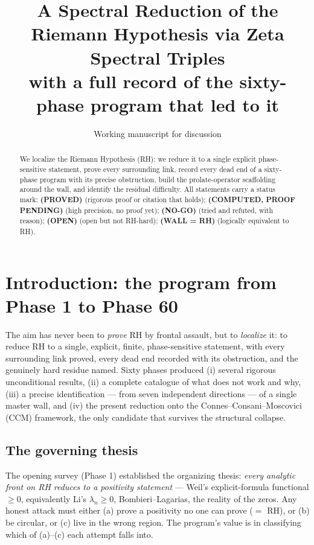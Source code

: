\documentclass[11pt]{article}
\title{A Spectral Reduction of the Riemann Hypothesis via Zeta Spectral Triples\\[2pt]
\large with a full record of the sixty-phase program that led to it}
\author{Working manuscript for discussion}
\date{}
\theoremstyle{remark}
\newcommand{\PROVED}{\textbf{(PROVED)}}
\newcommand{\COMP}{\textbf{(COMPUTED, PROOF PENDING)}}
\newcommand{\NOGO}{\textbf{(NO-GO)}}
\newcommand{\OPEN}{\textbf{(OPEN)}}
\newcommand{\WALL}{\textbf{(WALL = RH)}}
\begin{document}
\maketitle

\begin{abstract}
\noindent We localize the Riemann Hypothesis (RH): we reduce it to a single explicit
phase-sensitive statement, prove every surrounding link, record every dead end of a
sixty-phase program with its precise obstruction, build the prolate-operator scaffolding
around the wall, and identify the residual difficulty. All statements carry a status mark:
\PROVED{} (rigorous proof or citation that holds); \COMP{} (high precision, no proof yet);
\NOGO{} (tried and refuted, with reason); \OPEN{} (open but not RH-hard); \WALL{} (logically
equivalent to RH).
\end{abstract}

\section{Introduction: the program from Phase 1 to Phase 60}

The aim has never been to \emph{prove} RH by frontal assault, but to \emph{localize} it: to
reduce RH to a single, explicit, finite, phase-sensitive statement, with every surrounding link
proved, every dead end recorded with its obstruction, and the genuinely hard residue named.
Sixty phases produced (i) several rigorous unconditional results, (ii) a complete catalogue of
what does not work and why, (iii) a precise identification --- from seven independent
directions --- of a single master wall, and (iv) the present reduction onto the
Connes--Consani--Moscovici (CCM) framework, the only candidate that survives the structural
collapse.

\subsection{The governing thesis}
The opening survey (Phase 1) established the organizing thesis: \emph{every analytic front on
RH reduces to a positivity statement} --- Weil's explicit-formula functional $\ge0$,
equivalently Li's $\lambda_n\ge0$, Bombieri--Lagarias, the reality of the zeros. Any honest
attack must either (a) prove a positivity no one can prove ($=$ RH), or (b) be circular, or (c)
live in the wrong region. The program's value is in classifying which of (a)--(c) each attempt
falls into.
\end{document}
